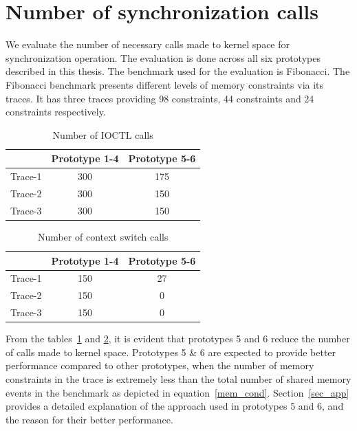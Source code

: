 \section{Number of synchronization calls \label{vol_kernel_calls}}

We evaluate the number of necessary calls made to kernel space for synchronization operation. 
The evaluation is done across all six prototypes described in this thesis. 
The benchmark used for the evaluation is Fibonacci. 
The Fibonacci benchmark presents different levels of memory constraints via its traces. 
It has three traces providing 98 constraints, 44 constraints and 24 constraints respectively. 

\begin{table}[h]
\begin{center}
 \begin{tabular}{|c c c|} 
 \hline
 & Prototype 1-4 & Prototype 5-6\\ %
 \hline
 Trace-1 & 300 & 175\\ 
 Trace-2 & 300 & 150\\
 Trace-3 & 300 & 150\\
 \hline
\end{tabular}
\end{center}
\caption{Number of IOCTL calls}
\label{num_ioctls}
\end{table}
\begin{table}
\begin{center}
 \begin{tabular}{|c c c|} 
 \hline
 & Prototype 1-4 & Prototype 5-6\\ %
 \hline
 Trace-1 & 150 & 27\\ 
 Trace-2 & 150 & 0\\
 Trace-3 & 150 & 0\\
 \hline
\end{tabular}
\end{center}
\caption{Number of context switch calls}
\label{num_ctxts}
\end{table}

From the tables~\ref{num_ioctls} and \ref{num_ctxts}, it is evident that prototypes 5 and 6 reduce the number of calls made to kernel space. 
Prototypes 5 \& 6 are expected to provide better performance compared to other prototypes, when the number of memory constraints in the trace is extremely less than the total number of shared memory events in the benchmark as depicted in equation~\ref{mem_cond}. 
Section~\ref{sec_app} provides a detailed explanation of the approach used in prototypes 5 and 6, and the reason for their better performance. 


